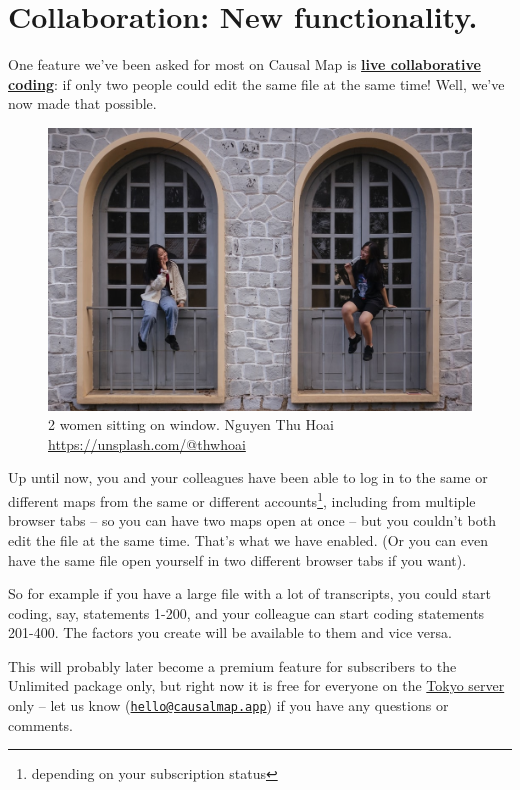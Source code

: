 \documentclass[
]{book}
\begin{document}
\hypertarget{collaboration-new-functionality.}{%
\section{Collaboration: New functionality.}\label{collaboration-new-functionality.}}

One feature we've been asked for most on Causal Map is \textbf{\href{https://guide.causalmap.app/collaborating-at-causal-map.html\#details}{live collaborative coding}}: if only two people could edit the same file at the same time! Well, we've now made that possible.

\begin{figure}
\centering
\includegraphics[width=6.77083in,height=\textheight]{_assets/photo-1580408377065-1da9909a26baixlib=rb-1.2.jpeg}
\caption{2 women sitting on window. Nguyen Thu Hoai \url{https://unsplash.com/@thwhoai}}
\end{figure}

Up until now, you and your colleagues have been able to log in to the same or different maps from the same or different accounts\footnote{depending on your subscription status}, including from multiple browser tabs -- so you can have two maps open at once -- but you couldn't both edit the file at the same time. That's what we have enabled. (Or you can even have the same file open yourself in two different browser tabs if you want).

So for example if you have a large file with a lot of transcripts, you could start coding, say, statements 1-200, and your colleague can start coding statements 201-400. The factors you create will be available to them and vice versa.

This will probably later become a premium feature for subscribers to the Unlimited package only, but right now it is free for everyone on the \href{https://causalmap.shinyapps.io/tokyo/}{Tokyo server} only -- let us know (\href{mailto:hello@causalmap.app}{\nolinkurl{hello@causalmap.app}}) if you have any questions or comments.
\end{document}
